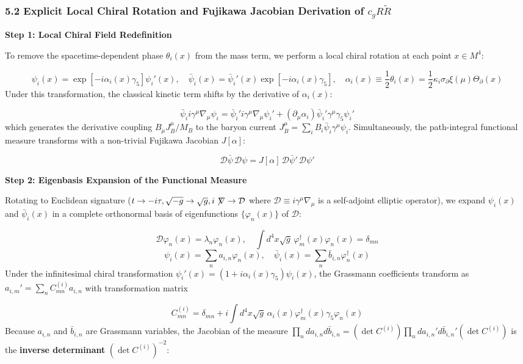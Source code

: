 \documentclass[aps,prd,onecolumn,superscriptaddress,nofootinbib,longbibliography,10pt]{revtex4-2}
\begin{document}
  
  
\subsubsection*{5.2 Explicit Local Chiral Rotation and Fujikawa Jacobian Derivation of \(c_g R\tilde{R}\)}

  \textbf{Step 1: Local Chiral Field Redefinition}


  To remove the spacetime-dependent phase \(\theta_i(x)\) from the mass term, we perform a local chiral rotation at each point \(x \in M^4\):


  \[ \psi_i(x) = \exp\left[-i\alpha_i(x)\gamma_5\right]\psi_i'(x), \quad \bar{\psi}_i(x) = \bar{\psi}_i'(x)\exp\left[-i\alpha_i(x)\gamma_5\right], \quad \alpha_i(x) \equiv \frac{1}{2}\theta_i(x) = \frac{1}{2}\kappa_i\sigma_\partial\xi(\mu)\Theta_\partial(x) \]
  Under this transformation, the classical kinetic term shifts by the derivative of \(\alpha_i(x)\):


  \[ \bar{\psi}_i i\gamma^\mu\nabla_\mu\psi_i = \bar{\psi}_i' i\gamma^\mu\nabla_\mu\psi_i' + (\partial_\mu\alpha_i)\bar{\psi}_i'\gamma^\mu\gamma_5\psi_i' \]
  which generates the derivative coupling \(B_\mu J_B^\mu / M_B\) to the baryon current \(J_B^\mu = \sum_i B_i\bar{\psi}_i\gamma^\mu\psi_i\). Simultaneously, the path-integral functional measure transforms with a non-trivial Fujikawa Jacobian \(J[\alpha]\):


  \[ \mathcal{D}\bar{\psi}\,\mathcal{D}\psi = J[\alpha]\,\mathcal{D}\bar{\psi}'\,\mathcal{D}\psi' \]

  \textbf{Step 2: Eigenbasis Expansion of the Functional Measure}


  Rotating to Euclidean signature (\(t \to -i\tau, \sqrt{-g} \to \sqrt{g}, i\not\!\nabla \to \mathcal{D}\) where \(\mathcal{D} \equiv i\gamma^\mu\nabla_\mu\) is a self-adjoint elliptic operator), we expand \(\psi_i(x)\) and \(\bar{\psi}_i(x)\) in a complete orthonormal basis of eigenfunctions \(\{\varphi_n(x)\}\) of \(\mathcal{D}\):


  \[ \mathcal{D}\varphi_n(x) = \lambda_n\varphi_n(x), \quad \int d^4x\sqrt{g}\,\varphi_m^\dagger(x)\varphi_n(x) = \delta_{mn} \]
  \[ \psi_i(x) = \sum_n a_{i,n}\varphi_n(x), \quad \bar{\psi}_i(x) = \sum_n \bar{b}_{i,n}\varphi_n^\dagger(x) \]
  Under the infinitesimal chiral transformation \(\psi_i'(x) = (1 + i\alpha_i(x)\gamma_5)\psi_i(x)\), the Grassmann coefficients transform as \(a_{i,m}' = \sum_n C_{mn}^{(i)}a_{i,n}\) with transformation matrix


  \[ C_{mn}^{(i)} = \delta_{mn} + i\int d^4x\sqrt{g}\,\alpha_i(x)\varphi_m^\dagger(x)\gamma_5\varphi_n(x) \]
  Because \(a_{i,n}\) and \(\bar{b}_{i,n}\) are Grassmann variables, the Jacobian of the measure \(\prod_n da_{i,n}d\bar{b}_{i,n} = (\det C^{(i)})\prod_n da_{i,n}'d\bar{b}_{i,n}'(\det C^{(i)})\) is the \textbf{inverse determinant} \((\det C^{(i)})^{-2}\):
\end{document}

